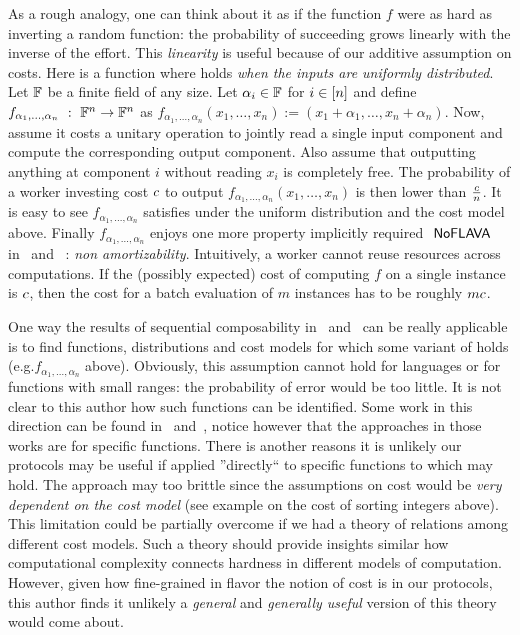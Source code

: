 As a rough analogy, one can think about it as if the function $f$ were as hard as inverting a random function: the probability of succeeding grows linearly with the inverse of the effort.
This \emph{linearity} is useful because of our additive assumption on costs.
Here is a function where \NoFLAVA holds \textit{when the inputs are uniformly distributed}.
Let $\mathbb{F}$ be a finite field of any size. Let $\alpha_i \in \mathbb{F}$ for $i \in [n]$ and define $f_{\alpha_1,\dots,\alpha_n}~:~\mathbb{F}^n \to \mathbb{F}^n$ as
$f_{\alpha_1,\dots,\alpha_n}(x_1,\dots,x_n) := (x_1+\alpha_1,\dots,x_n+\alpha_n)$.
Now, assume it costs a unitary operation to jointly read a single input component and compute the corresponding output component. Also assume that outputting anything at component $i$ without reading $x_i$ is completely free. The probability of a worker investing cost $c$ to output $f_{\alpha_1,\dots,\alpha_n}(x_1,\dots,x_n)$ is then lower than $\frac{c}{n}$. It is easy to see $f_{\alpha_1,\dots,\alpha_n}$ satisfies \NoFLAVA under the uniform distribution and the cost model above.
Finally $f_{\alpha_1,\dots,\alpha_n}$ enjoys one more property implicitly required $\textsf{ NoFLAVA }$ in~\cite{cg15} and ~\cite{cg17}: \textit{non amortizability}. Intuitively, a worker cannot reuse resources across computations. If the (possibly expected) cost of computing $f$ on a single instance is $c$, then the cost for a batch evaluation of $m$ instances has to be roughly $m c$.

One way the results of sequential composability in~\cite{cg15} and~\cite{cg17} can be really applicable is to find functions, distributions and cost models for which some variant of \NoFLAVA holds (e.g.$f_{\alpha_1,\dots,\alpha_n}$ above). 
Obviously, this assumption cannot hold for languages or for functions with small ranges: the probability of error would be too little.
It is not clear to this author how such functions can be identified. Some work in this direction can be found in~\cite{fghardness} 
and~\cite{fggr}, notice however that the approaches in those works are for specific functions.
There is another reasons it is unlikely our protocols may be useful if applied ''directly`` to specific functions to which \NoFLAVA may hold. 
The approach may too brittle since the assumptions on cost would be \textit{very dependent on the cost model} (see example on the cost of sorting integers above). This limitation could be partially overcome if we had a theory of relations among different cost models. Such a theory should  provide insights similar how computational complexity connects hardness in different models of computation. However, given how fine-grained in  flavor the notion of cost is in our protocols, this author finds it unlikely a \textit{general} and \textit{generally useful} version of this theory would come about.

